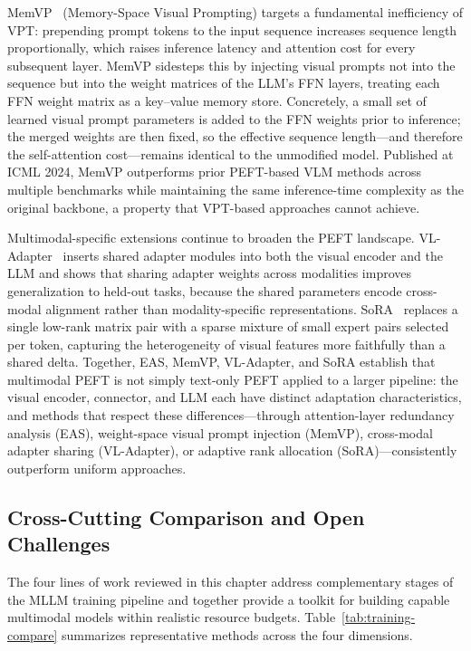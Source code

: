 MemVP~\cite{Jie202405615} (Memory-Space Visual Prompting) targets a fundamental inefficiency of VPT: prepending prompt tokens to the input sequence increases sequence length proportionally, which raises inference latency and attention cost for every subsequent layer. MemVP sidesteps this by injecting visual prompts not into the sequence but into the weight matrices of the LLM's FFN layers, treating each FFN weight matrix as a key--value memory store. Concretely, a small set of learned visual prompt parameters is added to the FFN weights prior to inference; the merged weights are then fixed, so the effective sequence length---and therefore the self-attention cost---remains identical to the unmodified model. Published at ICML 2024, MemVP outperforms prior PEFT-based VLM methods across multiple benchmarks while maintaining the same inference-time complexity as the original backbone, a property that VPT-based approaches cannot achieve.

Multimodal-specific extensions continue to broaden the PEFT landscape. VL-Adapter~\cite{Sung202112227} inserts shared adapter modules into both the visual encoder and the LLM and shows that sharing adapter weights across modalities improves generalization to held-out tasks, because the shared parameters encode cross-modal alignment rather than modality-specific representations. SoRA~\cite{Ding202312023} replaces a single low-rank matrix pair with a sparse mixture of small expert pairs selected per token, capturing the heterogeneity of visual features more faithfully than a shared delta. Together, EAS, MemVP, VL-Adapter, and SoRA establish that multimodal PEFT is not simply text-only PEFT applied to a larger pipeline: the visual encoder, connector, and LLM each have distinct adaptation characteristics, and methods that respect these differences---through attention-layer redundancy analysis (EAS), weight-space visual prompt injection (MemVP), cross-modal adapter sharing (VL-Adapter), or adaptive rank allocation (SoRA)---consistently outperform uniform approaches.

\subsection{Cross-Cutting Comparison and Open Challenges}
\label{subsec:training-summary}

The four lines of work reviewed in this chapter address complementary stages of the MLLM training pipeline and together provide a toolkit for building capable multimodal models within realistic resource budgets. Table~\ref{tab:training-compare} summarizes representative methods across the four dimensions.

